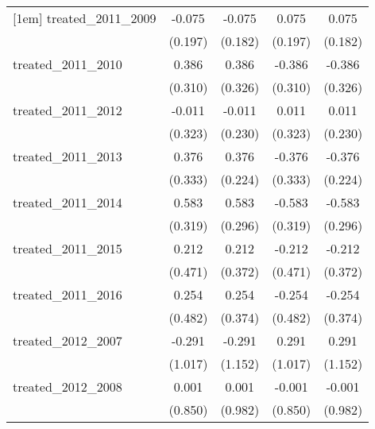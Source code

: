 {\begin{tabular}{l*{4}{c}}
[1em]
treated\_2011\_2009&      -0.075         &      -0.075         &       0.075         &       0.075         \\
            &     (0.197)         &     (0.182)         &     (0.197)         &     (0.182)         \\
[1em]
treated\_2011\_2010&       0.386         &       0.386         &      -0.386         &      -0.386         \\
            &     (0.310)         &     (0.326)         &     (0.310)         &     (0.326)         \\
[1em]
treated\_2011\_2012&      -0.011         &      -0.011         &       0.011         &       0.011         \\
            &     (0.323)         &     (0.230)         &     (0.323)         &     (0.230)         \\
[1em]
treated\_2011\_2013&       0.376         &       0.376         &      -0.376         &      -0.376         \\
            &     (0.333)         &     (0.224)         &     (0.333)         &     (0.224)         \\
[1em]
treated\_2011\_2014&       0.583         &       0.583\sym{*}  &      -0.583         &      -0.583\sym{*}  \\
            &     (0.319)         &     (0.296)         &     (0.319)         &     (0.296)         \\
[1em]
treated\_2011\_2015&       0.212         &       0.212         &      -0.212         &      -0.212         \\
            &     (0.471)         &     (0.372)         &     (0.471)         &     (0.372)         \\
[1em]
treated\_2011\_2016&       0.254         &       0.254         &      -0.254         &      -0.254         \\
            &     (0.482)         &     (0.374)         &     (0.482)         &     (0.374)         \\
[1em]
treated\_2012\_2007&      -0.291         &      -0.291         &       0.291         &       0.291         \\
            &     (1.017)         &     (1.152)         &     (1.017)         &     (1.152)         \\
[1em]
treated\_2012\_2008&       0.001         &       0.001         &      -0.001         &      -0.001         \\
            &     (0.850)         &     (0.982)         &     (0.850)         &     (0.982)         \\

\end{tabular}}
